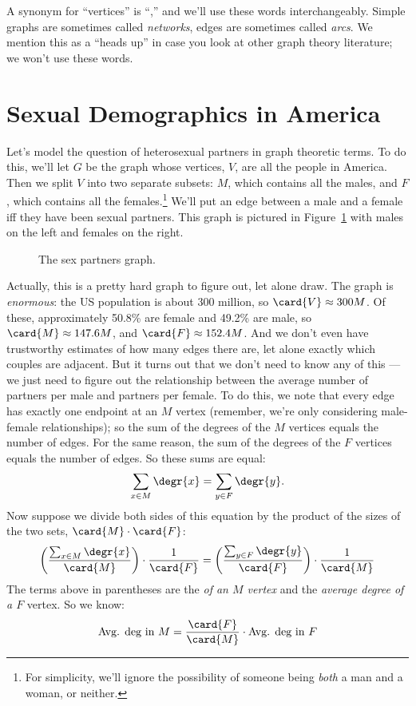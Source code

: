 A synonym for ``vertices'' is ``,'' and we'll use these
words interchangeably.  Simple graphs are sometimes
called \emph{networks}, edges are sometimes called \emph{arcs}.  We
mention this as a ``heads up'' in case you look at other graph theory
literature; we won't use these words.

\section{Sexual Demographics in America}\label{sexam}

Let's model the question of heterosexual partners in graph theoretic
terms.  To do this, we'll let $G$ be the graph whose vertices, $V$,
are all the people in America.  Then we split $V$ into two separate
subsets: $M$, which contains all the males, and $F$, which contains
all the females.\footnote{For simplicity, we'll ignore the possibility
  of someone being \emph{both} a man and a woman, or neither.}  We'll
put an edge between a male and a female iff they have been sexual
partners.  This graph is pictured in Figure~\ref{fig:partners} with
males on the left and females on the right.

\begin{figure}
\caption{The sex partners graph.}
\label{fig:partners}
\end{figure}

Actually, this is a pretty hard graph to figure out, let alone draw.
The graph is \emph{enormous}: the US population is about 300 million,
so $\card{V} \approx 300M$.  Of these, approximately 50.8\% are female
and 49.2\% are male, so $\card{M} \approx 147.6M$, and
$\card{F} \approx 152.4M$.  And we don't even have trustworthy
estimates of how many edges there are, let alone exactly which couples
are adjacent.  But it turns out that we don't need to know any of this
---we just need to figure out the relationship between the average
number of partners per male and partners per female.  To do this, we
note that every edge has exactly one endpoint at an $M$ vertex (remember,
we're only considering male-female relationships); so the sum of the
degrees of the $M$ vertices equals the number of edges.  For the same
reason, the sum of the degrees of the $F$ vertices equals the number
of edges.  So these sums are equal:
%
\[
\sum_{x \in M} \degr{x} = \sum_{y \in F} \degr{y}.
\]
%
Now suppose we divide both sides of this equation by the product of the sizes of the
two sets, $\card{M} \cdot \card{F}$:
%
\[
\left(\frac{\sum_{x \in M} \degr{x}}{\card{M}}\right) \cdot \frac{1}{\card{F}} =
\left(\frac{\sum_{y \in F} \degr{y}}{\card{F}}\right) \cdot \frac{1}{\card{M}}
\]
%
The terms above in parentheses are the \emph{ of an $M$ vertex} and
  the \emph{average degree of a $F$} vertex.  So we know:
\begin{equation}\label{avgsexMF}
\text{Avg. deg in $M$} = \frac{\card{F}}{\card{M}} \cdot \text{Avg. deg in $F$}
\end{equation}

